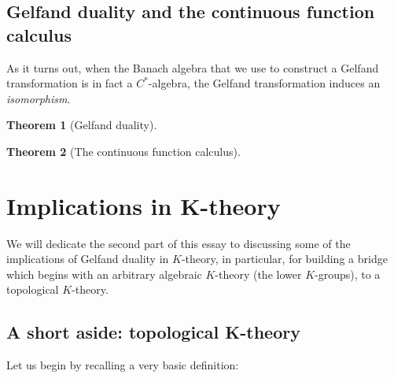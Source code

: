 \documentclass[aps,pra,showpacs,notitlepage,onecolumn,superscriptaddress,nofootinbib]{revtex4-1}
\theoremstyle{definition}
\newtheorem{theorem}{Theorem}[section]
\begin{document}
\subsection{Gelfand duality and the continuous function calculus}

\noindent As it turns out, when the Banach algebra that we use to construct a Gelfand transformation is in fact a $C^{*}$-algebra, the Gelfand transformation induces an \emph{isomorphism}.

\begin{theorem}[Gelfand duality]
\end{theorem}

\begin{theorem}[The continuous function calculus]
  \end{theorem}

\section{Implications in K-theory}

\noindent We will dedicate the second part of this essay to discussing some of the implications of Gelfand duality in $K$-theory, in particular, for building a bridge which begins with
an arbitrary algebraic $K$-theory (the lower $K$-groups), to a topological $K$-theory.

\subsection{A short aside: topological K-theory}

\noindent Let us begin by recalling a very basic definition:
\end{document}
